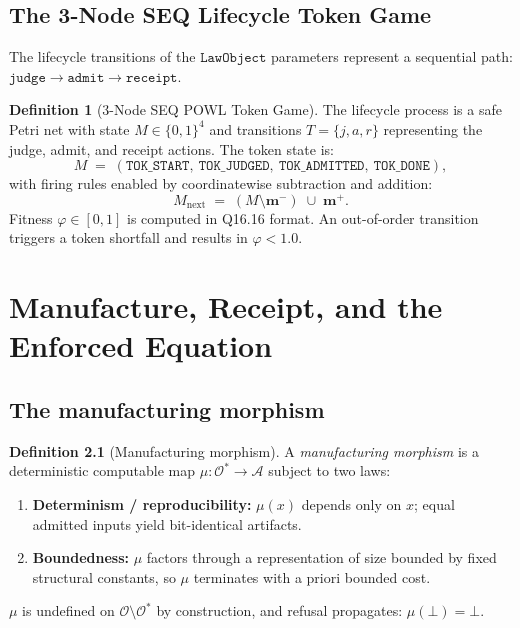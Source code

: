 \documentclass[11pt,oneside]{book}
\theoremstyle{definition}
\newtheorem{definition}{Definition}[chapter]
\theoremstyle{plain}
\theoremstyle{remark}
\newcommand{\Obs}{\mathcal{O}}                 %
\newcommand{\Adm}{\mathcal{O}^{*}}             %
\newcommand{\Act}{\mathcal{A}}                 %
\newcommand{\muop}{\mu}                        %
\newcommand{\Rfsl}{\bot}                        %
\newcommand{\Fitness}{\varphi}
\newcommand{\code}[1]{\texttt{#1}}
\begin{document}
\section{The 3-Node SEQ Lifecycle Token Game}

The lifecycle transitions of the $\code{LawObject}$ parameters represent a sequential path: $\code{judge} \to \code{admit} \to \code{receipt}$.

\begin{definition}[3-Node SEQ POWL Token Game]\label{def:seqtoken}
The lifecycle process is a safe Petri net with state $M\in\{0,1\}^{4}$ and transitions $T=\{j, a, r\}$ representing the judge, admit, and receipt actions. The token state is:
\begin{equation}\label{eq:seqtoken}
M\;=\;(\code{TOK\_START},\ \code{TOK\_JUDGED},\ \code{TOK\_ADMITTED},\ \code{TOK\_DONE}),
\end{equation}
with firing rules enabled by coordinatewise subtraction and addition:
\[
M_{\text{next}}\;=\;(M \setminus \bm m^{-}) \;\cup\; \bm m^{+}.
\]
Fitness $\Fitness\in[0,1]$ is computed in Q16.16 format. An out-of-order transition triggers a token shortfall and results in $\Fitness < 1.0$.
\end{definition}

\chapter{Manufacture, Receipt, and the Enforced Equation}
\label{ch:mu}

\section{The manufacturing morphism}

\begin{definition}[Manufacturing morphism]\label{def:mu}
A \emph{manufacturing morphism} is a deterministic computable map $\muop:\Adm\to\Act$
subject to two laws:
\begin{enumerate}[label=(M\arabic*),leftmargin=*]
  \item \textbf{Determinism / reproducibility:} $\muop(x)$ depends only on $x$; equal
        admitted inputs yield bit-identical artifacts.
  \item \textbf{Boundedness:} $\muop$ factors through a representation of size bounded by
        fixed structural constants, so $\muop$ terminates with a priori bounded cost.
\end{enumerate}
$\muop$ is undefined on $\Obs\setminus\Adm$ by construction, and refusal propagates:
$\muop(\Rfsl)=\Rfsl$.
\end{definition}
\end{document}
